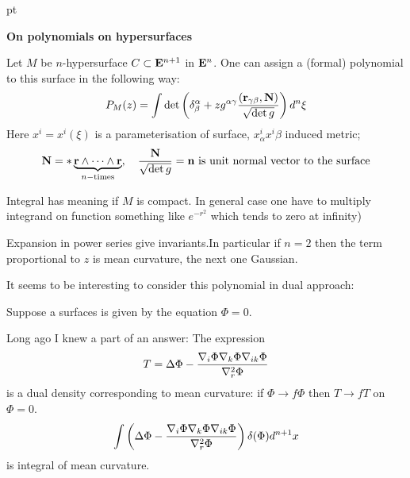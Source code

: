 
    pt

\def\V {{\cal V}}
\def\s {{\sigma}}
\def\Q {{\bf Q}}
\def\D {{\cal D}}
\def\G {{\Gamma}}
\def\C {{\bf C}}
\def\M {{\cal M}}
\def\Z {{\bf Z}}
\def\U  {{\cal U}}
\def\H {{\cal H}}
\def\R  {{\bf R}}
\def\l {\lambda}
\def\p {\partial}
\def\r {{\bf r}}
\def\v {{\bf v}}
\def\n {{\bf n}}
\def\t {{\bf t}}
\def\b {{\bf b}}
\def\ac {{\bf a}}
\def \X   {{\bf X}}
\def \Y   {{\bf Y}}
\def \E   {{\bf E}}
\def \N   {{\bf N}}

    \centerline {\bf On polynomials on hypersurfaces }

 \bigskip

   Let $M$ be $n$-hypersurface $C\subset \E^{n+1}$ in $\E^n$.
   One can assign  a (formal) polynomial to this surface in the following way:
                  $$
               P_M(z)=\int \det
               \left(
               \delta_{\beta}^\alpha+zg^{\alpha\gamma}
               {
               \left(
         \r_{\gamma\beta},\N\right)
               \over
             \sqrt{\det g}}
               \right)d^{n}\xi
                  $$
Here $x^i=x^i(\xi)$ is a parameterisation of surface, $x^i_\alpha
x^i\beta$ induced metric;
                         $$
      {\bf N}=*\underbrace{{\bf r}\wedge\dots\wedge {\bf r}} _{n-{\rm times}},
      \quad {{\bf N}\over \sqrt {\det g}}=\n\,\,
      \hbox {is unit normal vector to the surface}
                            $$

 Integral has meaning if $M$ is compact. In general case one have to multiply integrand
on function something like $e^{-r^2}$ which tends to zero at
infinity)

Expansion in power series give invariants.In particular if $n=2$
then the term proportional to $z$ is mean curvature, the next one
Gaussian.


  It seems to be interesting to consider this polynomial in dual approach:

Suppose a surfaces is given by the equation $\Phi=0$.

 Long ago I knew a part of an answer:
   The expression
                    $$
   T=\Delta\Phi-{\nabla_i\Phi\nabla_k\Phi\nabla_{ik}\Phi\over \nabla_r^2\Phi}
                    $$
is a dual density corresponding to mean curvature: if $\Phi\to f\Phi$ then $T\to fT$ on
$\Phi=0$.
                   $$
   \int \left(\Delta\Phi-{\nabla_i\Phi\nabla_k\Phi\nabla_{ik}\Phi\over \nabla_r^2\Phi}\right)
   \delta(\Phi)d^{n+1}x
                     $$
is integral of mean curvature.


